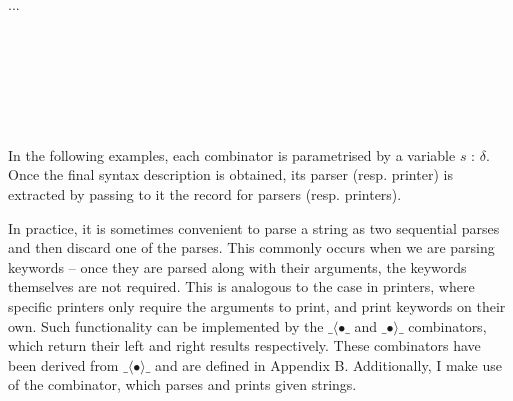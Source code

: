 \documentclass[12pt,a4paper,twoside,openright]{report}
\newcommand{\F}{\AgdaFunction}
\begin{document}
{ \begin{code}
 \> \AgdaSymbol{:}  \AgdaSymbol{(}   \AgdaSymbol{)} \<%
 \\
 \> \AgdaSymbol{=}  \AgdaInductiveConstructor{,}   ... \<%
 \\
 \>[0]\<[2]%
 \>[2]\<%
 \\
 \>[2]\<[4]%
 \>[4] \AgdaSymbol{:}       \<%
 \\
 \>[2]\<[4]%
 \>[4] \AgdaSymbol{(} \AgdaInductiveConstructor{,} \AgdaSymbol{)} \AgdaSymbol{=}  \AgdaSymbol{(}  \AgdaSymbol{)}\<%
 \\
 \\
 \>[2]\<[4]%
 \>[4] \AgdaSymbol{:}    \AgdaSymbol{(}   \AgdaSymbol{)}\<%
 \\
 \>[2]\<[4]%
 \>[4] \AgdaSymbol{(}  \AgdaSymbol{)} \AgdaSymbol{=}  \AgdaSymbol{(} \AgdaInductiveConstructor{,} \AgdaSymbol{)}\<%
 \\
 \>[4] \AgdaSymbol{\_} \AgdaSymbol{=} \<%
 \end{code}

In the following examples, each combinator is parametrised by a variable {$s$} : \F{Syntax} $\delta$. Once the final syntax description is obtained, its parser (resp. printer) is extracted by passing to it the \F{Syntax} record for parsers (resp. printers).

In practice, it is sometimes convenient to parse a string as two sequential parses and then discard one of the parses. This commonly occurs when we are parsing keywords -- once they are parsed along with their arguments, the keywords themselves are not required. This is analogous to the case in printers, where specific printers only require the arguments to print, and print keywords on their own. Such functionality can be implemented by the $\_\langle\bullet\_$ and $\_\bullet\rangle\_$ combinators, which return their left and right results respectively. These combinators have been derived from $\_\langle\bullet\rangle\_$ and are defined in Appendix B. Additionally, I make use of the \F{text} combinator, which parses and prints given strings.

}
\end{document}
